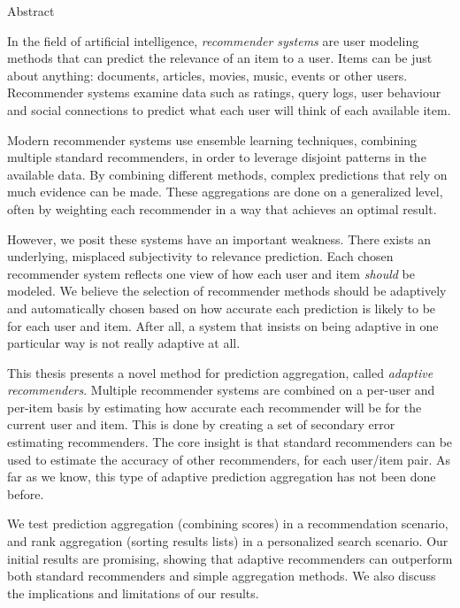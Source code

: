 \null\vspace{3em}
{
  \centering
  \normalfont
  \huge
  Abstract\\
}
\vspace{2em}

\noindent
In the field of artificial intelligence,
\emph{recommender systems} are user modeling methods
that can predict the relevance of an item to a user.
Items can be just about anything: 
documents, articles, movies, music, events or other users.
Recommender systems examine data such as ratings, query logs,
user behaviour and social connections to predict
what each user will think of each available item.

Modern recommender systems use ensemble learning techniques,
combining multiple standard recommenders,
in order to leverage disjoint patterns in the available data.
By combining different methods,
complex predictions that rely on much evidence can be made.
These aggregations are done on a generalized level,
often by weighting each recommender in a way
that achieves an optimal result.

However, we posit these systems have an important weakness.
There exists an underlying, misplaced subjectivity to relevance prediction.
Each chosen recommender system reflects one view of 
how each user and item \emph{should} be modeled.
We believe the selection of recommender methods should 
be adaptively and automatically chosen based on
how accurate each prediction is likely to be for each user and item.
After all, a system that insists on being adaptive
in one particular way is not really adaptive at all.

This thesis presents a novel method for prediction aggregation,
called \emph{adaptive recommenders}.
Multiple recommender systems are combined on a per-user and per-item basis
by estimating how accurate each recommender will be for the current user and item.
This is done by creating a set of secondary error estimating recommenders.
The core insight is that standard recommenders can be used
to estimate the accuracy of other recommenders, for each
user/item pair.
As far as we know, this type of adaptive prediction aggregation
has not been done before.

We test prediction aggregation (combining scores) in a
recommendation scenario,
and rank aggregation (sorting results lists) in a personalized search scenario.
Our initial results are promising, showing that adaptive recommenders
can outperform both standard recommenders and simple aggregation methods.
We also discuss the implications and limitations of our results.

\cleardoublepage
